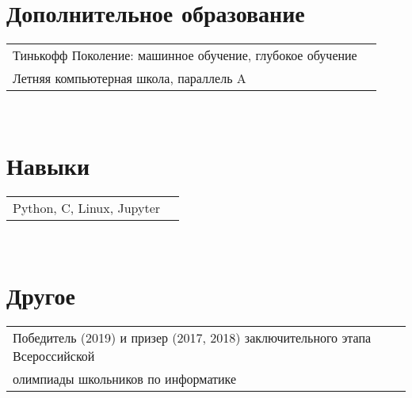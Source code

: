\documentclass[a4paper,11pt]{article}
\newcommand{\CC}{C\nolinebreak\hspace{-.05em}\raisebox{.4ex}{\tiny\bf +}\nolinebreak\hspace{-.10em}\raisebox{.4ex}{\tiny\bf +}}
\begin{document}
\section{Дополнительное образование}

\vspace{5px}
\begin{tabular}{lr}
Тинькофф Поколение: машинное обучение, глубокое обучение\\
Летняя компьютерная школа, параллель A
\end{tabular}
\\

\section{Навыки}

\vspace{5px}
\begin{tabular}{lr}
Python, \CC, Linux, Jupyter\\
\end{tabular}
\\
\section{Другое}

\vspace{5px}
\begin{tabular}{l}
Победитель (2019) и призер (2017, 2018) заключительного этапа Всероссийской \\\hspace{3.35cm}олимпиады школьников по информатике
\end{tabular}
\end{document}
